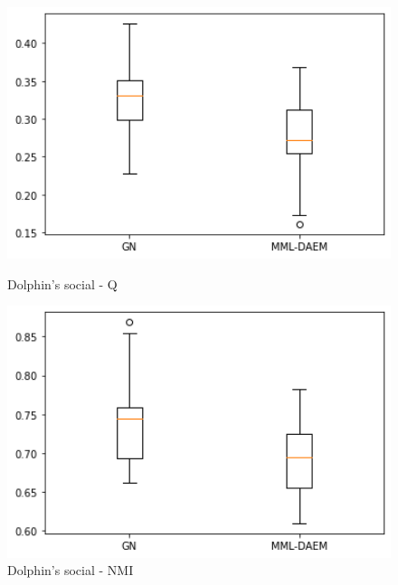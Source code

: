 \documentclass[a4paper,12pt,openany,oneside,utf-8]{ctexbook}
\begin{document}
    \begin{figure}[htp]
    \centering
    \begin{minipage}[t]{0.49\textwidth}
        \centering
        \includegraphics[width=1\textwidth]{figure/dolphin-q.png}
        \caption{Dolphin's social - Q}
        \label{f15}
    \end{minipage}
    \begin{minipage}[t]{0.49\textwidth}
        \centering
        \includegraphics[width=1\textwidth]{figure/dolphin-nmi.png}
        \caption{Dolphin's social - NMI}
        \label{f16}
        \end{minipage}
    \end{figure}
    
\end{document}
